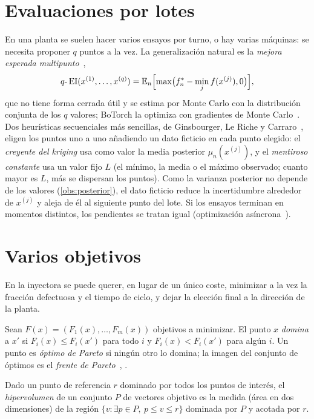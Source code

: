 \section{Evaluaciones por lotes}

En una planta se suelen hacer varios ensayos por turno, o hay varias máquinas: se necesita proponer $q$ puntos a la vez. La generalización natural es la \emph{mejora esperada multipunto}~\cite{ginsbourger},
\[
q\text{-}\operatorname{EI}(x^{(1)},\dots,x^{(q)})=\mathbb{E}_n\Bigl[\max\bigl(f^{*}_{n}-\min_{j}f(x^{(j)}),0\bigr)\Bigr],
\]
que no tiene forma cerrada útil y se estima por Monte Carlo con la distribución conjunta de los $q$ valores; BoTorch la optimiza con gradientes de Monte Carlo~\cite{botorch}. Dos heurísticas secuenciales más sencillas, de Ginsbourger, Le Riche y Carraro~\cite{ginsbourger}, eligen los puntos uno a uno añadiendo un dato ficticio en cada punto elegido: el \emph{creyente del kriging} usa como valor la media posterior $\mu_n(x^{(j)})$, y el \emph{mentiroso constante} usa un valor fijo $L$ (el mínimo, la media o el máximo observado; cuanto mayor es $L$, más se dispersan los puntos). Como la varianza posterior no depende de los valores (\cref{obs:posterior}), el dato ficticio reduce la incertidumbre alrededor de $x^{(j)}$ y aleja de él al siguiente punto del lote. Si los ensayos terminan en momentos distintos, los pendientes se tratan igual (optimización asíncrona~\cite[§11.4]{garnett}).

\section{Varios objetivos}

En la inyectora se puede querer, en lugar de un único coste, minimizar a la vez la fracción defectuosa y el tiempo de ciclo, y dejar la elección final a la dirección de la planta.

\begin{definicion}\label{def:pareto}
Sean $F(x)=(F_1(x),\dots,F_m(x))$ objetivos a minimizar. El punto $x$ \emph{domina} a $x'$ si $F_i(x)\le F_i(x')$ para todo $i$ y $F_i(x)<F_i(x')$ para algún $i$. Un punto es \emph{óptimo de Pareto} si ningún otro lo domina; la imagen del conjunto de óptimos es el \emph{frente de Pareto}~\cite[§12.1]{kw}, \cite[§9.2]{mn}.
\end{definicion}

\begin{definicion}[Hipervolumen]\label{def:hv}
Dado un punto de referencia $r$ dominado por todos los puntos de interés, el \emph{hipervolumen} de un conjunto $P$ de vectores objetivo es la medida (área en dos dimensiones) de la región $\{v: \exists p\in P,\ p\le v\le r\}$ dominada por $P$ y acotada por $r$.
\end{definicion}

